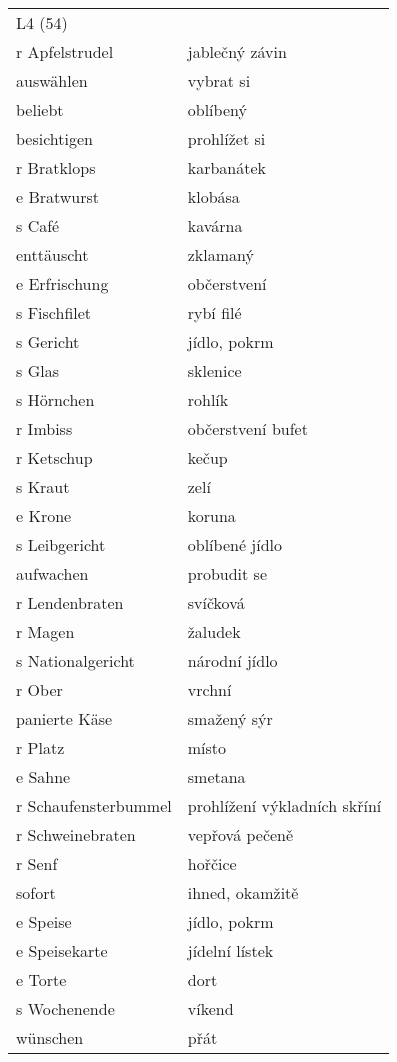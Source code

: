 \documentclass{article}
\begin{document}
\begin{tabular}{ p{5cm}|p{5cm}  }
    \\
    L4 (54) \\
    r Apfelstrudel & jablečný závin\\
    auswählen & vybrat si\\
    beliebt & oblíbený\\
    besichtigen & prohlížet si\\
    r Bratklops & karbanátek\\
    e Bratwurst & klobása\\
    s Café & kavárna\\
    enttäuscht & zklamaný\\
    e Erfrischung & občerstvení\\
    s Fischfilet & rybí filé\\
    s Gericht & jídlo, pokrm\\
    s Glas & sklenice\\
    s Hörnchen & rohlík\\
    r Imbiss & občerstvení bufet\\
    r Ketschup & kečup\\
    s Kraut & zelí\\
    e Krone & koruna\\
    s Leibgericht & oblíbené jídlo\\
    aufwachen & probudit se \\
    r Lendenbraten & svíčková\\
    r Magen & žaludek\\
    s Nationalgericht & národní jídlo\\
    r Ober & vrchní\\
    panierte Käse & smažený sýr\\
    r Platz & místo\\
    e Sahne & smetana\\
    r Schaufensterbummel & prohlížení výkladních skříní\\
    r Schweinebraten & vepřová pečeně\\
    r Senf & hořčice\\
    sofort & ihned, okamžitě\\
    e Speise & jídlo, pokrm\\
    e Speisekarte & jídelní lístek\\
    e Torte & dort\\
    s Wochenende & víkend\\
    wünschen & přát \\
\end{tabular}
\end{document}
